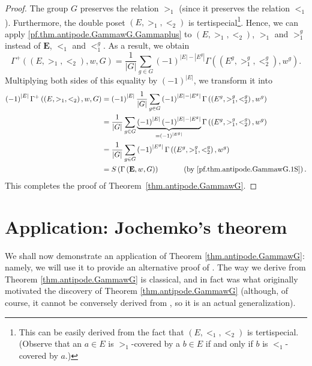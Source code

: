 \documentclass[12pt]{article}
\theoremstyle{plain}
\theoremstyle{definition}
\theoremstyle{remark}
\let\sumnonlimits\sum
\renewcommand{\sum}{\sumnonlimits\limits}
\newcommand{\EE}{{\mathbf{E}}}
\begin{document}
\begin{proof}
The group $G$ preserves the relation $>_1$ (since it preserves the
relation $<_1$).
Furthermore, the double poset $\left( E, >_1, <_2 \right)$ is
tertispecial\footnote{This can be easily derived from the fact
that $\left( E, <_1, <_2 \right)$ is tertispecial. (Observe that
an $a \in E$ is $>_1$-covered by a $b \in E$ if and only if $b$
is $<_1$-covered by $a$.)}.
Hence, we can apply
\eqref{pf.thm.antipode.GammawG.Gammaplus}
to $\left(  E,>_{1},<_{2}\right)  $, $>_1$ and $>_1^g$
instead of $\EE$, $<_1$ and $<_1^g$. As a result, we obtain
\[
\Gamma^{+}\left(  \left(  E,>_{1},<_{2}\right)  ,w,G\right)  =\dfrac
{1}{\left\vert G\right\vert }\sum_{g\in G}\left(  -1\right)  ^{\left\vert
E\right\vert -\left\vert E^{g}\right\vert }\Gamma\left(  \left(  E^{g}%
,>_{1}^{g},<_{2}^{g}\right)  ,w^{g}\right)  .
\]
Multiplying both sides of this equality by $\left(  -1\right)  ^{\left\vert
E\right\vert }$, we transform it into
\begin{align*}
\left(  -1\right)  ^{\left\vert E\right\vert }\Gamma^{+}\left(  \left(
E,>_{1},<_{2}\right)  ,w,G\right)
& = \left(  -1\right)  ^{\left\vert E\right\vert}
\dfrac{1}{\left\vert G\right\vert }\sum_{g\in G}
\left(  -1\right)  ^{\left\vert E\right\vert -\left\vert E^{g}\right\vert }%
\Gamma\left(  \left(
E^{g},>_{1}^{g},<_{2}^{g}\right)  ,w^{g}\right)  \\
& =\dfrac{1}{\left\vert G\right\vert
}\sum_{g\in G}\underbrace{\left(  -1\right)  ^{\left\vert E\right\vert
}\left(  -1\right)  ^{\left\vert E\right\vert -\left\vert E^{g}\right\vert }%
}_{=\left(  -1\right)  ^{\left\vert E^{g}\right\vert }}\Gamma\left(  \left(
E^{g},>_{1}^{g},<_{2}^{g}\right)  ,w^{g}\right)  \\
& =\dfrac{1}{\left\vert G\right\vert }\sum_{g\in G}\left(  -1\right)
^{\left\vert E^{g}\right\vert }\Gamma\left(  \left(  E^{g},>_{1}^{g},<_{2}%
^{g}\right)  ,w^{g}\right)  \\
& =S\left(  \Gamma\left(  { \EE },w,G\right)  \right)
\ \ \ \ \ \ \ \ \ \ 
\left(  \text{by \eqref{pf.thm.antipode.GammawG.1S}}\right)  .
\end{align*}
This completes the proof of Theorem~\ref{thm.antipode.GammawG}.
\end{proof}


\section{Application: Jochemko's theorem}
\label{sect.jochemko}

We shall now demonstrate an application of Theorem \ref{thm.antipode.GammawG}:
namely, we will use it to provide an alternative proof of \cite[Theorem
2.13]{Joch}. The way we derive \cite[Theorem 2.13]{Joch} from Theorem
\ref{thm.antipode.GammawG} is classical, and in fact was what originally
motivated the discovery of Theorem \ref{thm.antipode.GammawG} (although, of
course, it cannot be conversely derived from \cite[Theorem 2.13]{Joch}, so it
is an actual generalization).
\end{document}
